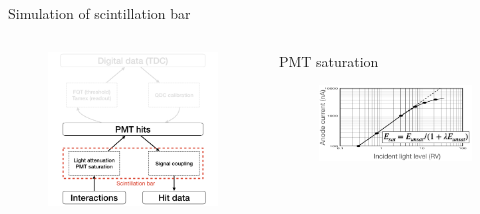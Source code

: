 \documentclass[compress, 13pt, aspectratio=169]{beamer}
\begin{document}
\begin{frame}{Simulation of scintillation bar}
    \begin{columns}
        \begin{column}{0.5\textwidth}
            \begin{figure}[t]
                \includegraphics[keepaspectratio, height = 0.8\textheight]{digiFlow/digiFlow.006.png}%
            \end{figure}
        \end{column}
        \begin{column}{0.5\textwidth}
            \pause
            \vspace*{-0.3cm}
            \begin{block}{\small PMT saturation\footnotemark}
                \begin{figure}[t]
                    \includegraphics[keepaspectratio, height = 0.4\textwidth]{PMTSAT}%

\end{figure}
\end{block}
\end{column}
\end{columns}
\end{frame}
\end{document}
